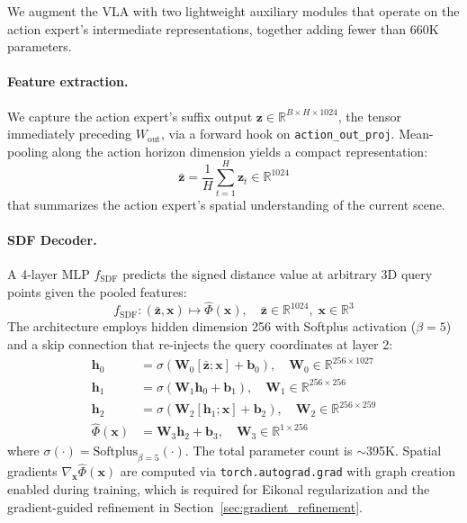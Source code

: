 We augment the VLA with two lightweight auxiliary modules that operate on the action expert's intermediate representations, together adding fewer than 660K parameters.

\paragraph{Feature extraction.} We capture the action expert's suffix output $\mathbf{z} \in \mathbb{R}^{B \times H \times 1024}$, the tensor immediately preceding $W_{\mathrm{out}}$, via a forward hook on \texttt{action\_out\_proj}. Mean-pooling along the action horizon dimension yields a compact representation:
\begin{equation}\label{eq:pooling}
\bar{\mathbf{z}} = \frac{1}{H} \sum_{t=1}^{H} \mathbf{z}_t \in \mathbb{R}^{1024}
\end{equation}
that summarizes the action expert's spatial understanding of the current scene.

\paragraph{SDF Decoder.} A 4-layer MLP $f_\mathrm{SDF}$ predicts the signed distance value at arbitrary 3D query points given the pooled features:
\begin{equation}\label{eq:sdf_decoder}
f_\mathrm{SDF}: (\bar{\mathbf{z}}, \mathbf{x}) \mapsto \hat{\Phi}(\mathbf{x}), \quad \bar{\mathbf{z}} \in \mathbb{R}^{1024},\; \mathbf{x} \in \mathbb{R}^3
\end{equation}
The architecture employs hidden dimension 256 with Softplus activation ($\beta = 5$) and a skip connection that re-injects the query coordinates at layer 2:
\begin{align}
\mathbf{h}_0 &= \sigma(\mathbf{W}_0 [\bar{\mathbf{z}}; \mathbf{x}] + \mathbf{b}_0), \quad \mathbf{W}_0 \in \mathbb{R}^{256 \times 1027} \label{eq:sdf_layer0} \\
\mathbf{h}_1 &= \sigma(\mathbf{W}_1 \mathbf{h}_0 + \mathbf{b}_1), \quad \mathbf{W}_1 \in \mathbb{R}^{256 \times 256} \\
\mathbf{h}_2 &= \sigma(\mathbf{W}_2 [\mathbf{h}_1; \mathbf{x}] + \mathbf{b}_2), \quad \mathbf{W}_2 \in \mathbb{R}^{256 \times 259} \\
\hat{\Phi}(\mathbf{x}) &= \mathbf{W}_3 \mathbf{h}_2 + \mathbf{b}_3, \quad \mathbf{W}_3 \in \mathbb{R}^{1 \times 256} \label{eq:sdf_output}
\end{align}
where $\sigma(\cdot) = \mathrm{Softplus}_{\beta=5}(\cdot)$. The total parameter count is ${\sim}$395K. Spatial gradients $\nabla_{\mathbf{x}} \hat{\Phi}(\mathbf{x})$ are computed via \texttt{torch.autograd.grad} with graph creation enabled during training, which is required for Eikonal regularization and the gradient-guided refinement in Section~\ref{sec:gradient_refinement}.

